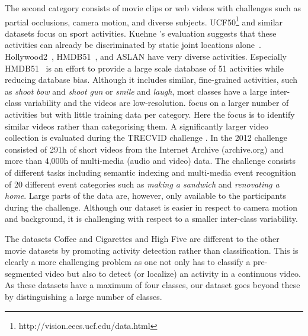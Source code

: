 The second category consists of movie clips or web videos with challenges such as partial occlusions, camera motion, and diverse subjects. UCF50\footnote{\label{fn:ucf50}http://vision.eecs.ucf.edu/data.html} and similar~\citep{liu09cvpr,niebles10eccv,rodriguez08cvpr} datasets focus on sport activities. Kuehne \etal's evaluation suggests that these activities can already be discriminated by static joint locations alone~\citep{kuehne11iccv}. 
%
Hollywood2~\citep{marszalek09cvpr}, HMDB51~\citep{kuehne11iccv}, and ASLAN \citep{kliper12pami} have very diverse activities. Especially HMDB51~\citep{kuehne11iccv} is an effort to provide a large scale database of 51 activities while reducing database bias. Although it includes similar, fine-grained activities, such as \emph{shoot bow} and \emph{shoot gun} or \emph{smile} and \emph{laugh}, most classes have a large inter-class variability and the videos are low-resolution. \citet{kliper12pami} focus on a larger number of activities but with little training data per category. Here the focus is to identify similar videos rather than categorising them.
A significantly larger video collection is evaluated during the TRECVID challenge \citep{over12tv}. In the 2012 challenge consisted of 291h of short videos from the Internet Archive
(archive.org) and more than 4,000h of multi-media (audio and video) data. The challenge consists of different tasks including semantic indexing and multi-media event recognition of 20 different event categories such as \emph{making a sandwich} and \emph{renovating a home}. Large parts of the data are, however, only available to the participants during the challenge.
% 
Although our dataset is easier in respect to camera motion and background, it is challenging with respect to a smaller inter-class variability. 
 
The datasets Coffee and Cigarettes \citep{laptev07iccv} and High Five \citep{patron10bmvc}  are different to the other movie datasets by promoting activity detection rather than classification. This is clearly a more challenging problem as one not only has to classify a pre-segmented video but also to detect (or localize) an activity in a continuous video. %
As these datasets have a maximum of four classes, our dataset goes beyond these by distinguishing a large number of classes.
%  
 
